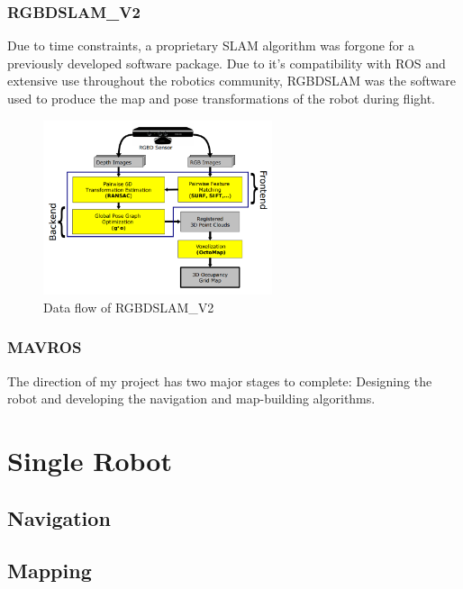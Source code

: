 \documentclass[letterpaper, oneside, 10pt]{report}
\begin{document}
\subsection{RGBDSLAM\_V2}

Due to time constraints, a proprietary SLAM algorithm was forgone for a previously developed software package. Due to it's compatibility with ROS and extensive use throughout the robotics community, RGBDSLAM was the software used to produce the map and pose transformations of the robot during flight.

\begin{figure}[h]
 \caption{Data flow of RGBDSLAM_V2}
 \centering
   \includegraphics[width=0.6\textwidth]{images/rgbdslam}
\end{figure}

\subsection{MAVROS}

The direction of my project has two major stages to complete: Designing the robot and developing the navigation and map-building algorithms. \\


\chapter{Single Robot}
\section{Navigation}



\section{Mapping}
\end{document}
